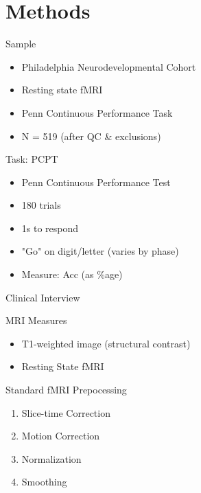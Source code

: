 \documentclass[presentation]{beamer}
\begin{document}
\section{Methods}
\label{sec:orgheadline15}
\begin{frame}[label={sec:orgheadline4}]{Sample}
\begin{itemize}
\item Philadelphia Neurodevelopmental Cohort
\item Resting state fMRI
\item Penn Continuous Performance Task
\item N = 519 (after QC \& exclusions)
\end{itemize}
\end{frame}
\begin{frame}[label={sec:orgheadline5}]{Task: PCPT}
\begin{itemize}
\item Penn Continuous Performance Test
\item 180 trials
\item 1s to respond
\item "Go" on digit/letter (varies by phase)
\item Measure: Acc (as \%age)
\end{itemize}
\end{frame}
\begin{frame}[label={sec:orgheadline6}]{Clinical Interview}
\end{frame}
\begin{frame}[label={sec:orgheadline7}]{MRI Measures}
\begin{itemize}
\item T1-weighted image (structural contrast)
\item Resting State fMRI
\end{itemize}
\end{frame}
\begin{frame}[label={sec:orgheadline8}]{Standard fMRI Prepocessing}
\begin{enumerate}
\item Slice-time Correction
\item Motion Correction
\item Normalization
\item Smoothing
\end{enumerate}
\end{frame}
\end{document}

